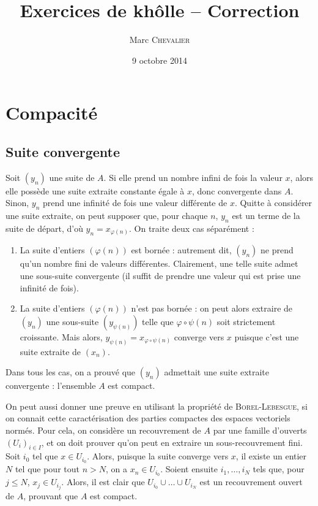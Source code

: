 

\title{Exercices de khôlle \--- Correction}
\author{Marc \textsc{Chevalier}}
\date{9 octobre 2014}


\maketitle
\setcounter{tocdepth}{2}
\tableofcontents

\section{Compacité}

\subsection{Suite convergente}

Soit $(y_n)$ une suite de $A$. Si elle prend un nombre infini de fois la valeur $x$, alors elle possède une suite extraite constante égale à $x$, donc convergente dans $A$. Sinon, $y_n$ prend une infinité de fois une valeur différente de $x$. Quitte à considérer une suite extraite, on peut supposer que, pour chaque $n$, $y_n$ est un terme de la suite de départ, d'où $y_n=x_{\varphi(n)}$. On traite deux cas séparément :
\begin{enumerate}
    \item La suite d'entiers $(\varphi(n))$ est bornée : autrement dit, $(y_n)$ ne prend qu'un nombre fini de valeurs différentes. Clairement, une telle suite admet une sous-suite convergente (il suffit de prendre une valeur qui est prise une infinité de fois).
    \item La suite d'entiers $(\varphi(n))$ n'est pas bornée : on peut alors extraire de $(y_n)$ une sous-suite $\left(y_{\psi(n)}\right)$ telle que $\varphi\circ\psi(n)$ soit strictement croissante. Mais alors, $y_{\psi(n)}=x_{\varphi\circ\psi(n)}$ converge vers $x$ puisque c'est une suite extraite de $(x_n)$. 
\end{enumerate} 

Dans tous les cas, on a prouvé que $(y_n)$ admettait une suite extraite convergente : l'ensemble $A$ est compact.

\bigskip

On peut aussi donner une preuve en utilisant la propriété de \textsc{Borel-Lebesgue}, si on connait cette caractérisation des parties compactes des espaces vectoriels normés. Pour cela, on considère un recouvrement de $A$ par une famille d'ouverts $(U_i)_{i\in I}$, et on doit prouver qu'on peut en extraire un sous-recouvrement fini. Soit $i_0$ tel que $x\in U_{i_0}$. Alors, puisque la suite converge vers $x$, il existe un entier $N$ tel que 
pour tout $n>N$, on a $x_n\in U_{i_0}$. Soient ensuite $i_1,\dots,i_N$ tels que, pour $j\leq N$, $x_j\in U_{i_j}$. Alors, il est clair que 
$U_{i_0}\cup\dots\cup U_{i_N}$ est un recouvrement ouvert de $A$, prouvant que $A$ est compact.

